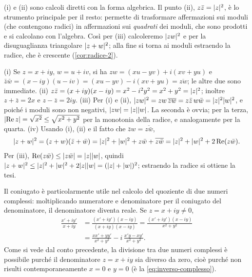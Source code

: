\begin{strategia}
(i) e (ii) sono calcoli diretti con la forma algebrica. Il punto (ii),
$z\bar z=\lvert z\rvert^{2}$, è lo strumento principale per il resto: permette di trasformare
affermazioni sui moduli (che contengono radici) in affermazioni sui \emph{quadrati} dei
moduli, che sono prodotti e si calcolano con l'algebra. Così per (iii) calcoleremo
$\lvert zw\rvert^{2}$ e per la disuguaglianza triangolare $\lvert z+w\rvert^{2}$; alla fine si
torna ai moduli estraendo la radice, che è crescente (\cref{cor:radice-2}).
\end{strategia}

\begin{dimostrazione}
(i) Se $z=x+iy$, $w=u+iv$, si ha $zw=(xu-yv)+i(xv+yu)$ e
$\bar z\bar w=(x-iy)(u-iv)=(xu-yv)-i(xv+yu)=\overline{zw}$; le altre due sono immediate.
(ii) $z\bar z=(x+iy)(x-iy)=x^{2}-i^{2}y^{2}=x^{2}+y^{2}=\lvert z\rvert^{2}$; inoltre
$z+\bar z=2x$ e $z-\bar z=2iy$.
(iii) Per (i) e (ii), $\lvert zw\rvert^{2}=zw\,\overline{zw}=z\bar z\,w\bar w=\lvert z\rvert^{2}\lvert w\rvert^{2}$,
e poiché i moduli sono non negativi, $\lvert zw\rvert=\lvert z\rvert\lvert w\rvert$. La seconda è ovvia; per la
terza, $\lvert \operatorname{Re}z\rvert=\sqrt{x^{2}}\le\sqrt{x^{2}+y^{2}}$ per la monotonia della
radice, e analogamente per la quarta.
(iv) Usando (i), (ii) e il fatto che $\bar zw=\overline{z\bar w}$,
\[
  \lvert z+w\rvert^{2}=(z+w)(\bar z+\bar w)=\lvert z\rvert^{2}+\lvert w\rvert^{2}+z\bar w+\overline{z\bar w}
  =\lvert z\rvert^{2}+\lvert w\rvert^{2}+2\operatorname{Re}(z\bar w).
\]
Per (iii), $\operatorname{Re}(z\bar w)\le\lvert z\bar w\rvert=\lvert z\rvert\lvert w\rvert$, quindi
$\lvert z+w\rvert^{2}\le\lvert z\rvert^{2}+\lvert w\rvert^{2}+2\lvert z\rvert\lvert w\rvert=(\lvert z\rvert+\lvert w\rvert)^{2}$; estraendo la
radice si ottiene la tesi.
\end{dimostrazione}

Il coniugato è particolarmente utile nel calcolo del quoziente di due numeri complessi:
moltiplicando numeratore e denominatore per il coniugato del denominatore, il
denominatore diventa reale. Se $z=x+iy\neq0$,
\begin{equation}\label{eq:quoziente-algebrico}
\begin{split}
  \frac{x'+iy'}{x+iy}&=\frac{(x'+iy')(x-iy)}{(x+iy)(x-iy)}=\frac{(x'+iy')(x-iy)}{x^{2}+y^{2}}\\
  &=\frac{xx'+yy'}{x^{2}+y^{2}}-i\,\frac{x'y-xy'}{x^{2}+y^{2}}.
\end{split}
\end{equation}
Come si vede dal conto precedente, la divisione tra due numeri complessi è possibile
purché il denominatore $z=x+iy$ sia diverso da zero, cioè purché non risulti
contemporaneamente $x=0$ e $y=0$ (è la \eqref{eq:inverso-complesso}).

